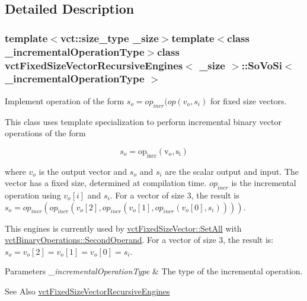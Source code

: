 \subsection{Detailed Description}
\subsubsection*{template$<$vct\-::size\-\_\-type \-\_\-size$>$template$<$class \-\_\-incremental\-Operation\-Type$>$class vct\-Fixed\-Size\-Vector\-Recursive\-Engines$<$ \-\_\-size $>$\-::\-So\-Vo\-Si$<$ \-\_\-incremental\-Operation\-Type $>$}

Implement operation of the form $s_o = op_{incr}(op(v_o, s_i)$ for fixed size vectors. 

This class uses template specialization to perform incremental binary vector operations of the form

\[ s_o = \mathrm{op_{incr}(v_{o}, s_i)} \]

where $v_{o}$ is the output vector and $s_o$ and $s_i$ are the scalar output and input. The vector has a fixed size, determined at compilation time. $op_{incr}$ is the incremental operation using $v_{o}[i]$ and $s_i$. For a vector of size 3, the result is $s_o = op_{incr}(op_{incr}(v_o[2], op_{incr}(v_o[1], op_{incr}(v_o[0], s_i))))$.

This engines is currently used by \hyperlink{classvct_fixed_size_vector_base_ae0659dd664fd0be5b5c4ff9c2d13c64e}{vct\-Fixed\-Size\-Vector\-::\-Set\-All} with \hyperlink{classvct_binary_operations_1_1_second_operand}{vct\-Binary\-Operations\-::\-Second\-Operand}. For a vector of size 3, the result is\-: $s_o = v_o[2] = v_o[1] = v_o[0] = s_i$.


\begin{DoxyParams}{Parameters}
{\em \-\_\-incremental\-Operation\-Type} & The type of the incremental operation.\\
\hline
\end{DoxyParams}
\begin{DoxySeeAlso}{See Also}
\hyperlink{classvct_fixed_size_vector_recursive_engines}{vct\-Fixed\-Size\-Vector\-Recursive\-Engines} 
\end{DoxySeeAlso}


